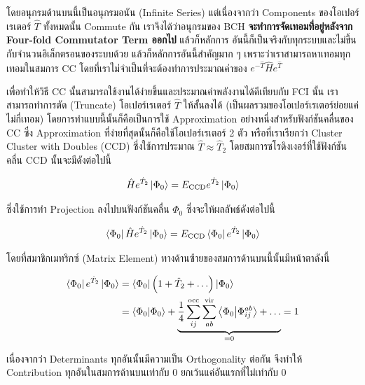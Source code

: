 \noindent โดยอนุกรมด้านบนนี้เป็นอนุกรมอนัน (Infinite Series) แต่เนื่องจากว่า Components ของโอเปอร์เรเตอร์ $\hat{T}$ ทั้งหมดนั้น
Commute กัน เราจึงได้ว่าอนุกรมของ BCH \textbf{จะทำการจัดเทอมที่อยู่หลังจาก Four-fold Commutator Term ออกไป} แล้วก็หลักการ%
อันนี้ก็เป็นจริงกับทุกระบบและไม่ขึ้นกับจำนวนอิเล็กตรอนของระบบด้วย แล้วก็หลักการอันนี้สำคัญมาก ๆ เพราะว่าเราสามารถหาเทอมทุกเทอมในสมการ
CC โดยที่เราไม่จำเป็นที่จะต้องทำการประมาณค่าของ $e^{-\hat{T}} \hat{H} e^{\hat{T}}$

เพื่อทำให้วิธี CC นั้นสามารถใช้งานได้ง่ายขึ้นและประมาณค่าพลังงานได้ดีเทียบกับ FCI นั้น เราสามารถทำการตัด (Truncate) โอเปอร์เรเตอร์ $\hat{T}$
ให้สั้นลงได้ (เป็นผลรวมของโอเปอร์เรเตอร์ย่อยแค่ไม่กี่เทอม) โดยการทำแบบนี้นั้นก็คือเป็นการใช้ Approximation อย่างหนึ่งสำหรับฟังก์ชันคลื่นของ CC
ซึ่ง Approximation ที่ง่ายที่สุดนั้นก็คือใช้โอเปอร์เรเตอร์ 2 ตัว หรือที่เราเรียกว่า Cluster Cluster with Doubles (CCD) ซึ่งใช้การประมาณ
$\hat{T} \approx \hat{T}_2$ โดยสมการชโรดิงเงอร์ที่ใช้ฟังก์ชันคลื่น CCD นั้นจะมีดังต่อไปนี้

\begin{equation}
  \hat{H} e^{\hat{T}_2}\ket{\Phi_0}
  =
  E_{\mathrm{CCD}} e^{\hat{T}_2}\ket{\Phi_0}
\end{equation}

\noindent ซึ่งใช้การทำ Projection ลงไปบนฟังก์ชันคลื่น $\Phi_0$ ซึ่งจะให้ผลลัพธ์ดังต่อไปนี้

\begin{equation}
  \label{eq:ccd_eq_proj}
  \bra{\Phi_0}\hat{H} e^{\hat{T}_2}\ket{\Phi_0}
  =
  E_{\mathrm{CCD}} \bra{\Phi_0}e^{\hat{T}_2}\ket{\Phi_0}
\end{equation}

\noindent โดยที่สมาชิกเมทริกซ์ (Matrix Element) ทางด้านซ้ายของสมการด้านบนนี้นั้นมีหน้าตาดังนี้

\begin{equation}
  \begin{split}
    \bra{\Phi_0}e^{\hat{T}_2}\ket{\Phi_0}
    &= \bra{\Phi_0}\left(1 + \hat{T}_2 + \ldots\right)\ket{\Phi_0} \\
    &=  \braket{\Phi_0}{\Phi_0} +
    \underbrace{
    \frac{1}{4} \sum_{ij}^{\mathrm{occ}} \sum_{ab}^{\mathrm{vir}} \braket{\Phi_0}{\Phi_{ij}^{ab}}
    + \ldots
    }_{
    = 0}
    = 1
  \end{split}
\end{equation}

\noindent เนื่องจากว่า Determinants ทุกอันนั้นมีความเป็น Orthogonality ต่อกัน จึงทำให้ Contribution ทุกอันในสมการด้านบนเท่ากับ
0 ยกเว้นแค่อันแรกที่ไม่เท่ากับ 0

